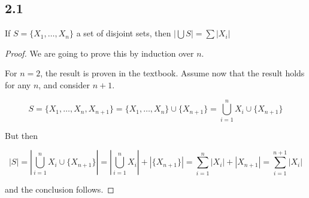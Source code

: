 \subsection*{2.1} If $S = \{X_1, \dots, X_n\}$ a set of disjoint sets, then $|\bigcup S| = \sum |X_i|$

\begin{proof}
We are going to prove this by induction over $n$.

For $n = 2$, the result is proven in the textbook. Assume now that the result holds for any $n$, and consider $n+1$.

$$S = \{X_1, \dots, X_n, X_{n+1}\} =  \{X_1, \dots, X_n\} \cup \{X_{n+1}\} = \bigcup_{i=1}^n X_i \cup  \{X_{n+1}\}$$

But then

$$|S| = | \bigcup_{i=1}^n X_i \cup  \{X_{n+1}\}| = | \bigcup_{i=1}^n X_i| + |  \{X_{n+1}\}| = \sum_{i=1}^n |X_i| + |X_{n+1}| = \sum_{i=1}^{n+1} |X_i|$$

and the conclusion follows.

\end{proof}

